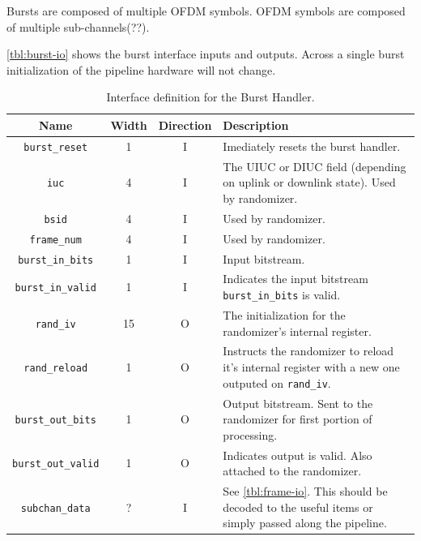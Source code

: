 \documentclass[dvips,10pt,twocolumn]{article}
\begin{document}
Bursts are composed of multiple OFDM symbols. OFDM symbols are composed of
multiple sub-channels(??). 

\autoref{tbl:burst-io} shows the burst interface inputs and outputs.
Across a single burst initialization of the pipeline hardware will not
change.

\begin{table} \begin{tabularx}{\textwidth}{c|c|c|X}
	\label{tbl:burst-io}
	Name & Width & Direction & Description \\ \hline
	
	\texttt{burst\_reset} & 1 & I & Imediately resets the burst handler.
	\\

	\texttt{iuc} & 4 & I & The UIUC or DIUC field (depending on uplink
	or downlink state). Used by randomizer. \\
	
	\texttt{bsid} & 4 & I & Used by randomizer. \\
	
	\texttt{frame\_num} & 4 & I & Used by randomizer. \\

	\texttt{burst\_in\_bits} & 1 & I & Input bitstream. \\

	\texttt{burst\_in\_valid} & 1 &  I & Indicates the input bitstream
	\texttt{burst\_in\_bits} is valid. \\

	\texttt{rand\_iv} & 15 & O & The initialization for
	the randomizer's internal register. \\

	\texttt{rand\_reload} & 1 & O & Instructs the randomizer to reload
	it's internal register with a new one outputed on
	\texttt{rand\_iv}. \\

	\texttt{burst\_out\_bits} & 1 & O & Output bitstream. Sent to the
	randomizer for first portion of processing. \\

	\texttt{burst\_out\_valid} & 1 & O & Indicates output is valid.
	Also attached to the randomizer. \\

	\texttt{subchan\_data} & ? & I & See \autoref{tbl:frame-io}. This
	should be decoded to the useful items or simply passed along the
	pipeline.

\end{tabularx}
\caption{Interface definition for the Burst Handler.}
\end{table}
\end{document}
